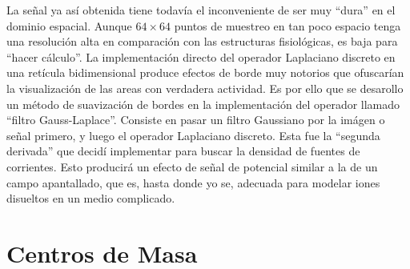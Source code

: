 \documentclass{article}
\begin{document}
La señal ya así obtenida tiene todavía el inconveniente
de ser muy ``dura'' en el dominio espacial. Aunque $64\times 64$
puntos de muestreo en tan poco espacio tenga una resolución
alta en comparación con las estructuras fisiológicas, es baja
para ``hacer cálculo''. La implementación directo del operador
Laplaciano discreto en una retícula bidimensional produce
efectos de borde muy notorios que ofuscarían la visualización
de las areas con verdadera actividad. Es por ello que se
desarollo un método de suavización de bordes en la  implementación
del operador llamado ``filtro Gauss-Laplace''. Consiste en pasar
un filtro Gaussiano por la imágen o señal primero, y luego el 
operador Laplaciano discreto. Esta fue la ``segunda derivada'' que
decidí implementar para buscar la densidad de fuentes de corrientes.
Esto producirá un efecto de señal de potencial similar a 
la de un campo apantallado, que es, hasta donde yo se,
 adecuada para modelar iones disueltos en un  medio
complicado.



\section{Centros de Masa}
\end{document}
